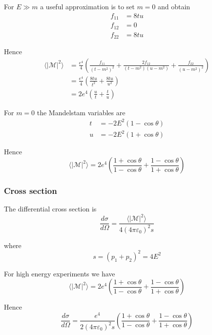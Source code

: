 For $E\gg m$ a useful approximation is to set $m=0$ and obtain
\begin{align*}
f_{11}&=8tu
\\
f_{12}&=0
\\
f_{22}&=8tu
\end{align*}

Hence
\begin{align*}
\langle|\mathcal{M}|^2\rangle
&=\frac{e^4}{4}
\left(
\frac{f_{11}}{(t-m^2)^2}
+\frac{2f_{12}}{(t-m^2)(u-m^2)}
+\frac{f_{22}}{(u-m^2)^2}
\right)
\\
&=\frac{e^4}{4}
\left(
\frac{8tu}{t^2}
+\frac{8tu}{u^2}
\right)
\\
&=2e^4
\left(
\frac{u}{t}
+\frac{t}{u}
\right)
\end{align*}

For $m=0$ the Mandelstam variables are
\begin{align*}
t&=-2E^2(1-\cos\theta)
\\
u&=-2E^2(1+\cos\theta)
\end{align*}

Hence
\begin{equation*}
\langle|\mathcal{M}|^2\rangle
=2e^4\left(
\frac{1+\cos\theta}{1-\cos\theta}+
\frac{1-\cos\theta}{1+\cos\theta}
\right)
\end{equation*}

\subsubsection*{Cross section}

The differential cross section is
\begin{equation*}
\frac{d\sigma}{d\Omega}=\frac{\langle|\mathcal{M}|^2\rangle}{4(4\pi\varepsilon_0)^2s}
\end{equation*}

where
\begin{equation*}
s=(p_1+p_2)^2=4E^2
\end{equation*}

For high energy experiments we have
\begin{equation*}
\langle|\mathcal{M}|^2\rangle=2e^4\left(
\frac{1+\cos\theta}{1-\cos\theta}+
\frac{1-\cos\theta}{1+\cos\theta}
\right)
\end{equation*}

Hence
\begin{equation*}
\frac{d\sigma}{d\Omega}
=\frac{e^4}{2(4\pi\varepsilon_0)^2s}\left(\frac{1+\cos\theta}{1-\cos\theta}+\frac{1-\cos\theta}{1+\cos\theta}\right)
\end{equation*}

